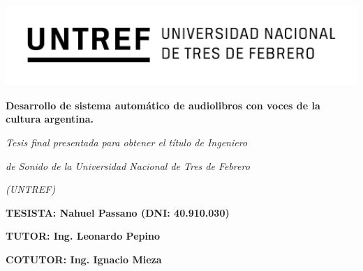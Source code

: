 \documentclass[12pt]{article}
\begin{document}
\begin{titlepage}
\centering
\includegraphics[width=13.58cm, height=3.1cm]{Logo Untref.png} 

\vspace{0.1cm}

\hspace*{-1.31cm}%
\begin{minipage}[t]{16cm}
\centering
{}
\vspace{0.5cm} %

\end{minipage}


\vspace{36pt}

{\bfseries\fontsize{22pt}{18pt} \selectfont Desarrollo de sistema automático de audiolibros con voces de la cultura argentina. \par}

\vspace{42pt}


\vspace{64pt}

{\centering\itshape\fontsize{14pt}{1pt}\selectfont Tesis final presentada para obtener el título de Ingeniero\par}
{\centering\itshape\fontsize{14pt}{1pt}\selectfont de Sonido de la Universidad Nacional de Tres de Febrero \par}
{\centering\itshape\fontsize{14pt}{1pt}\selectfont (UNTREF) \par}

\vspace{70pt}

{\bfseries\fontsize{14pt}{0pt}\selectfont TESISTA: Nahuel Passano (DNI: 40.910.030) \par}
{\bfseries\fontsize{14pt}{0pt}\selectfont TUTOR: Ing. Leonardo Pepino \par}
{\bfseries\fontsize{14pt}{0pt}\selectfont COTUTOR: Ing. Ignacio Mieza \par}


\end{titlepage}
\end{document}
